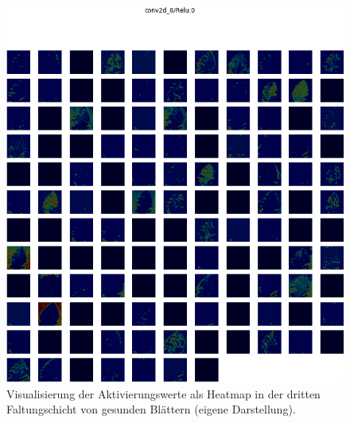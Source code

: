 \begin{figure}[h!]
	\centering
	\includegraphics[width=\textwidth]{visualisierungen/healthy/heatmap_mit/conv2d_8.png}
	\caption{Visualisierung der Aktivierungswerte als Heatmap in der dritten Faltungschicht von gesunden Blättern (eigene Darstellung).}
	\label{}
\end{figure}

